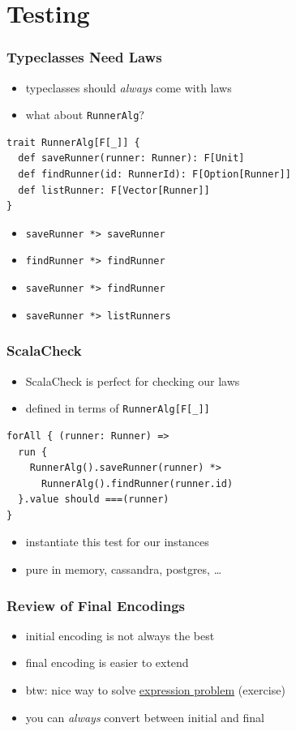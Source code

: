 \documentclass{beamer}
\begin{document}
\section{Testing}

\begin{frame}[fragile]
  \frametitle{Typeclasses Need Laws}
  \begin{itemize}
  \item<1-> typeclasses should \textit{always} come with laws
  \item<1-> what about \texttt{RunnerAlg}?
  \end{itemize}
\begin{verbatim}
trait RunnerAlg[F[_]] {
  def saveRunner(runner: Runner): F[Unit]
  def findRunner(id: RunnerId): F[Option[Runner]]
  def listRunner: F[Vector[Runner]]
}
\end{verbatim}
  \begin{itemize}
  \item<2-> \texttt{saveRunner *> saveRunner}
  \item<2-> \texttt{findRunner *> findRunner}
  \item<2-> \texttt{saveRunner *> findRunner}
  \item<2-> \texttt{saveRunner *> listRunners}
  \end{itemize}
\end{frame}

\begin{frame}[fragile]
  \frametitle{ScalaCheck}
  \begin{itemize}
  \item ScalaCheck is perfect for checking our laws
  \item defined in terms of \texttt{RunnerAlg[F[\_]]}
  \end{itemize}

\begin{verbatim}
forAll { (runner: Runner) =>
  run {
    RunnerAlg().saveRunner(runner) *>
      RunnerAlg().findRunner(runner.id)
  }.value should ===(runner)
}
\end{verbatim}
  \begin{itemize}
  \item instantiate this test for our instances
  \item pure in memory, cassandra, postgres, \dots{}
  \end{itemize}
\end{frame}

\begin{frame}
  \frametitle{Review of Final Encodings}
  \begin{itemize}
  \item initial encoding is not always the best
  \item final encoding is easier to extend
  \item btw: nice way to solve \href{https://stackoverflow.com/questions/3596366/what-is-the-expression-problem\#3776140}{expression problem} (exercise)
  \item you can \textit{always} convert between initial and final
  \end{itemize}
\end{frame}
\end{document}
